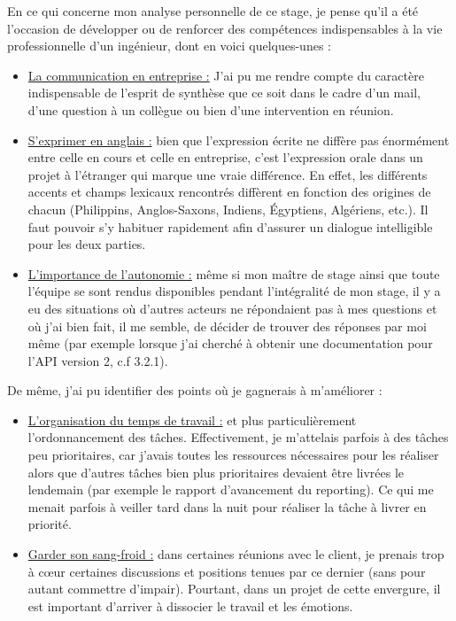 En ce qui concerne mon analyse personnelle de ce stage, je pense qu'il a été l'occasion de développer ou de renforcer des compétences indispensables à la vie professionnelle d'un ingénieur, dont en voici quelques-unes :
\begin{itemize}
\item \underline{La communication en entreprise :} J'ai pu me rendre compte du caractère indispensable de l'esprit de synthèse que ce soit dans le cadre d'un mail, d'une question à un collègue ou bien d'une intervention en réunion.
\item \underline{S'exprimer en anglais :} bien que l'expression écrite ne diffère pas énormément entre celle en cours et celle en entreprise, c'est l'expression orale dans un projet à l'étranger qui marque une vraie différence. En effet, les différents accents et champs lexicaux rencontrés diffèrent en fonction des origines de chacun (Philippins, Anglos-Saxons, Indiens, Égyptiens, Algériens, etc.). Il faut pouvoir s'y habituer rapidement afin d'assurer un dialogue intelligible pour les deux parties.
\item \underline{L'importance de l'autonomie :} même si mon maître de stage ainsi que toute l'équipe se sont rendus disponibles pendant l'intégralité de mon stage, il y a eu des situations où d'autres acteurs ne répondaient pas à mes questions et où j'ai bien fait, il me semble, de décider de trouver des réponses par moi même (par exemple lorsque j'ai cherché à obtenir une documentation pour l'API version 2,  c.f 3.2.1).
\end{itemize}

De même, j'ai pu identifier des points où je gagnerais à m'améliorer :
\begin{itemize}
\item \underline{L'organisation du temps de travail :} et plus particulièrement l'ordonnancement des tâches. Effectivement, je m'attelais parfois à des tâches peu prioritaires, car j'avais toutes les ressources nécessaires pour les réaliser alors que d'autres tâches bien plus prioritaires devaient être livrées le lendemain (par exemple le rapport d'avancement du reporting). Ce qui me menait parfois à veiller tard dans la nuit pour réaliser la tâche à livrer en priorité.
\item \underline{Garder son sang-froid :} dans certaines réunions avec le client, je prenais trop à cœur certaines discussions et positions tenues par ce dernier (sans pour autant commettre d'impair). Pourtant, dans un projet de cette envergure, il est important d'arriver à dissocier le travail et les émotions.
\end{itemize}

